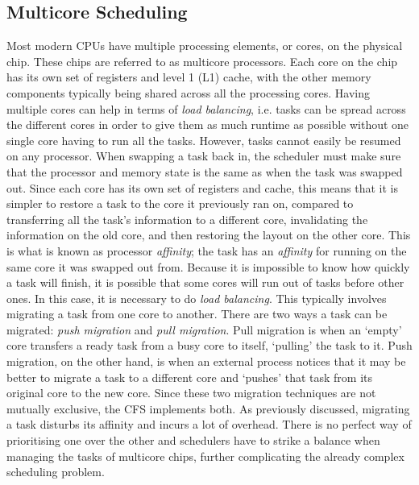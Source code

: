     \subsection{Multicore Scheduling}
    Most modern CPUs have multiple processing elements, or cores, on the
    physical chip. These chips are referred to as multicore processors. Each
    core on the chip has its own set of registers and level 1 (L1) cache, with
    the other memory components typically being shared across all the processing
    cores. Having multiple cores can help in terms of \textit{load balancing},
    i.e. tasks can be spread across the different cores in order to give them as
    much runtime as possible without one single core having to run all the
    tasks. However, tasks cannot easily be resumed on any processor.
    When swapping a task back in, the scheduler must make sure that the
    processor and memory state is the same as when the task was swapped out.
    Since each core has its own set of registers and cache, this means that it
    is simpler to restore a task to the core it previously ran on, compared to
    transferring all the task's information to a different core, invalidating
    the information on the old core, and then restoring the layout on the other
    core. This is what is known as processor \textit{affinity}; the task has an
    \textit{affinity} for running on the same core it was swapped out from.
    Because it is impossible to know how quickly a task will finish, it is
    possible that some cores will run out of tasks before other ones. In this
    case, it is necessary to do \textit{load balancing}. This typically involves
    migrating a task from one core to another. There are two ways a task can be
    migrated: \textit{push migration} and \textit{pull migration}. Pull
    migration is when an `empty' core transfers a ready task from a busy core to
    itself, `pulling' the task to it. Push migration, on the other hand, is when
    an external process notices that it may be better to migrate a task to a
    different core and `pushes' that task from its original core to the new
    core. Since these two migration techniques are not mutually exclusive, the
    CFS implements both. As previously discussed, migrating a task disturbs its
    affinity and incurs a lot of overhead. There is no perfect way of
    prioritising one over the other and schedulers have to strike a balance when
    managing the tasks of multicore chips, further complicating the already
    complex scheduling problem.

